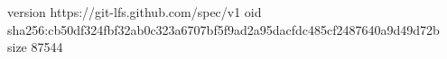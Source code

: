 version https://git-lfs.github.com/spec/v1
oid sha256:cb50df324fbf32ab0c323a6707bf5f9ad2a95dacfdc485cf2487640a9d49d72b
size 87544
